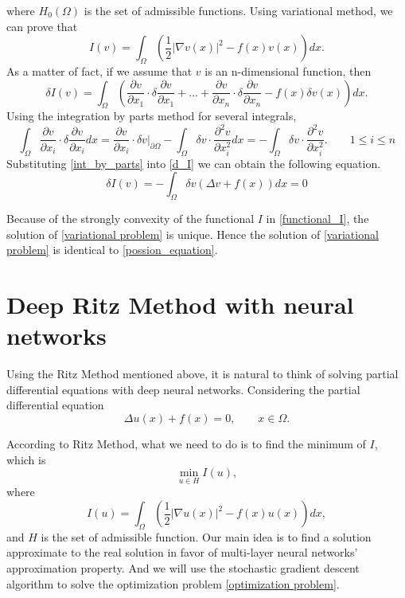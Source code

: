 \documentclass{article}
\begin{document}
where $H_{0}(\Omega)$ is the set of admissible functions. Using variational method, we can prove that 
\begin{equation}\label{functional_I}
I(v)=\int_\Omega\left(\frac{1}{2}|\nabla v(x)|^2-f(x)v(x)\right)dx. 
\end{equation}
As a matter of fact, if we assume that $v$ is an n-dimensional function, then
\begin{equation}\label{d_I}
\delta I(v)=\int _{\Omega} \left(\frac{\partial v}{\partial x_1}\cdot \delta \frac{\partial v}{\partial x_1}+...+\frac{\partial v}{\partial x_n}\cdot   \delta \frac{\partial v}{\partial x_n}-f(x)\delta      v(x)   \right)dx.
\end{equation}
Using the integration by parts method for several integrals,
\begin{equation}\label{int_by_parts}
\int _{\Omega}\frac{\partial v}{\partial x_i}\cdot \delta \frac{\partial v}{\partial x_i} dx= \frac{\partial v}{\partial x_i}\cdot \delta v\Big|_{\partial \Omega}-\int_{\Omega}\delta v \cdot \frac{\partial^2 v}{\partial x_i ^2}dx=-\int_{\Omega}\delta v \cdot \frac{\partial^2 v}{\partial x_i ^2}. \qquad 1\le i\le n
\end{equation}
Substituting \eqref{int_by_parts} into \eqref{d_I} we can obtain the following equation.
\begin{equation}
\delta I(v)=-\int_{\Omega}\delta v(\Delta v+f(x))dx=0
\end{equation}
\par Because of the strongly convexity of the functional $I$ in \eqref{functional_I}, the solution of \eqref{variational problem} is unique. Hence the solution of \eqref{variational problem} is identical to \eqref{possion_equation}.

\section{Deep Ritz Method with neural networks}
\par Using the Ritz Method mentioned above, it is natural to think of solving partial differential equations with deep neural networks. Considering the partial differential equation
\begin{equation}
\Delta u(x)+f(x)=0,\qquad x\in \Omega.
\end {equation}
\par According to Ritz Method, what we need to do is to find the minimum of $I$, which is
\begin{equation}\label{optimization problem}
\min\limits_{u\in H}{I(u)},
\end{equation}
where
\begin{equation}\label{I_equ}
I(u)=\int_\Omega\left(\frac{1}{2}|\nabla u(x)|^2-f(x)u(x)\right)dx,
\end{equation}
and $H$ is the set of admissible function. Our main idea is to find a solution approximate to the real solution in favor of multi-layer neural networks' approximation property. And we will use the stochastic gradient descent algorithm to solve the optimization problem \eqref{optimization problem}.
\end{document}

